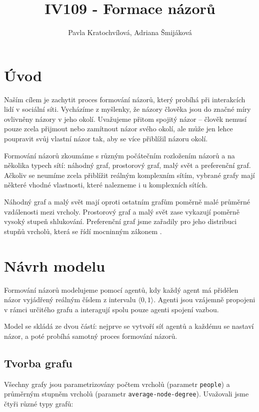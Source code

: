 \documentclass[10pt,a4paper]{report}
\author{Pavla Kratochvílová, Adriana Šmijáková}
\title{IV109 - Formace názorů}
\begin{document}
\maketitle
\chapter{Úvod}
Naším cílem je zachytit proces formování názorů, který probíhá při interakcích lidí v sociální síti. Vycházíme z myšlenky, že názory člověka jsou do značné míry ovlivněny názory v jeho okolí. Uvažujeme přitom spojitý názor -- člověk nemusí pouze zcela přijmout nebo zamítnout názor svého okolí, ale může jen lehce poupravit svůj vlastní názor tak, aby se více přiblížil názoru okolí. 

Formování názorů zkoumáme s různým počátečním rozložením názorů a na několika typech sítí: náhodný graf, prostorový graf, malý svět a preferenční graf. Ačkoliv se neumíme zcela přiblížit reálným komplexním sítím, vybrané grafy mají některé vhodné vlastnosti, které nalezneme i u komplexních sítích. 

Náhodný graf a malý svět mají oproti ostatním grafům poměrně malé průměrné vzdálenosti mezi vrcholy. Prostorový graf a malý svět zase vykazují poměrně vysoký stupeň shlukování. Preferenční graf jsme zařadily pro jeho distribuci stupňů vrcholů, která se řídí mocninným zákonem \cite{zdroj}.

\chapter{Návrh modelu}
Formování názorů modelujeme pomocí agentů, kdy každý agent má přidělen názor vyjádřený reálným číslem z intervalu $\langle 0, 1 \rangle$. Agenti jsou vzájemně propojeni v rámci určitého grafu a interagují spolu pouze agenti spojení vazbou.

Model se skládá ze dvou částí: nejprve se vytvoří síť agentů a každému se nastaví názor, a poté probíhá samotný proces formování názorů.

\section{Tvorba grafu}
Všechny grafy jsou parametrizovány počtem vrcholů (parametr \texttt{people}) a prů\-měr\-ným stupněm vrcholů (parametr \texttt{average-node-degree}). Uvažovali jsme čtyři různé typy grafů:
\end{document}
